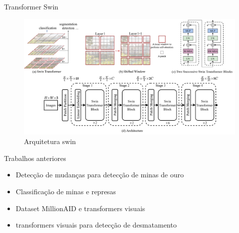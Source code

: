 \documentclass{beamer}
\begin{document}
\begin{frame}{Transformer Swin}

    \begin{figure}[!ht]
        \centering
        \includegraphics[width=\columnwidth]{Imagens/arquitetura swin.png}
        \caption{Arquitetura swin ~\cite{liu2022swin}}
        \label{fig:SWIN-arquitetura}
    \end{figure}

\end{frame}

\begin{frame}{Trabalhos anteriores}

    \begin{itemize}
        \item Detecção de mudanças para detecção de minas de ouro \cite{rs14071746}
        \item Classificação de minas e represas \cite{s20236936}
        \item Dataset MillionAID e transformers visuais ~\cite{wang2022empirical}
        \item transformers visuais para detecção de desmatamento ~\cite{9701667}
    \end{itemize}
\end{frame}
\end{document}
